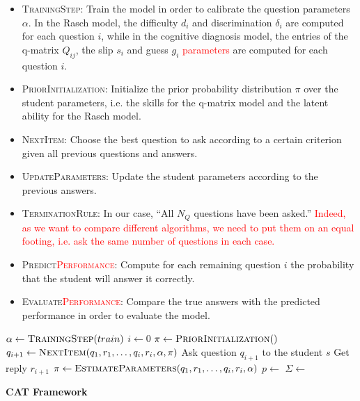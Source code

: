 \documentclass{sig-alternate}
\newcommand\alert[1]{\textcolor{red}{#1}}
\begin{document}
\begin{itemize}
\item \textsc{TrainingStep}: Train the model in order to calibrate the question parameters $\alpha$. In the Rasch model, the difficulty $d_i$ and discrimination $\delta_i$ are computed for each question $i$, while in the cognitive diagnosis model, the entries of the q-matrix $Q_{ij}$, the slip $s_i$ and guess $g_i$ \alert{parameters} are computed for each question $i$.
\item \textsc{PriorInitialization}: Initialize the prior probability distribution $\pi$ over the student parameters, i.e. the skills for the q-matrix model and the latent ability for the Rasch model. 
\item \textsc{NextItem}: Choose the best question to ask according to a certain criterion given all previous questions and answers. 
\item \textsc{UpdateParameters}: Update the student parameters according to the previous answers.
\item \textsc{TerminationRule}: In our case, ``All $N_Q$ questions have been asked.'' \alert{Indeed, as we want to compare different algorithms, we need to put them on an equal footing, i.e. ask the same number of questions in each case.}
\item \textsc{Predict\alert{Performance}}: Compute for each remaining question $i$ the probability that the student will answer it correctly.
\item \textsc{Evaluate\alert{Performance}}: Compare the true answers with the predicted performance in order to evaluate the model. 
\end{itemize}

\begin{algorithm}
\begin{algorithmic}
\State $\alpha \gets \Call{TrainingStep}{train}$
\State $i \gets 0$
	\State $\pi \gets \Call{PriorInitialization}$
		\State $q_{i + 1} \gets \Call{NextItem}{q_1, r_1, \ldots, q_i, r_i, \alpha, \pi}$
		\State Ask question $q_{i + 1}$ to the student $s$
		\State Get reply $r_{i + 1}$
		\State $\pi \gets \Call{EstimateParameters}{q_1, r_1, \ldots, q_i, r_i, \alpha}$
		\State $p \gets$ 
		\State $\Sigma \gets$ 
	\EndWhile
\EndFor
\EndProcedure
\end{algorithmic}
\caption{\textbf{CAT Framework}}
\label{algo}
\end{algorithm}
\end{document}
